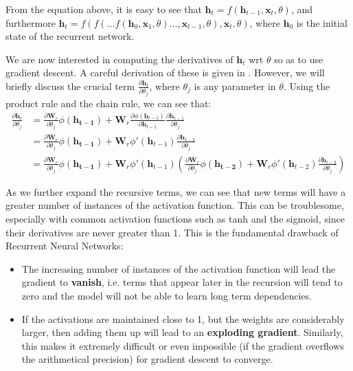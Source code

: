 \documentclass[pdftex,11pt,a4paper]{article}
\theoremstyle{definition}
\theoremstyle{remark}
\newcommand*{\V}[1]{\mathbf{#1}}%
\begin{document}
\par From the equation above, it is easy to see that $\V{h}_t = f(\V{h}_{t-1}, \V{x}_t, \theta)$, and furthermore $\V{h}_t = f(f(...f(\V{h}_0, \V{x}_1, \theta)..., \V{x}_{t-1}, \theta), \V{x}_t, \theta)$, where $\V{h}_0$ is the initial state of the recurrent network. 
\par We are now interested in computing the derivatives of $\V{h}_t$ wrt $\theta$ so as to use gradient descent. A careful derivation of these is given in \cite{Pascanu2012}. However, we will briefly discuss the crucial term $\frac{\partial\V{h}_t}{\partial\theta_j}$, where $\theta_j$ is any parameter in $\theta$. Using the product rule and the chain rule, we can see that:
\begin{align*}
    \frac{\partial\V{h}_t}{\partial\theta_j} &= \frac{\partial\V{W}_r}{\partial\theta_j} \phi(\V{h_{t-1}}) + \V{W}_r\frac{\partial \phi(\V{h}_{t-1})}{\partial\V{h}_{t-1}}\frac{\partial \V{h}_{t-1}}{\partial\theta_j}\\
    &= \frac{\partial\V{W}_r}{\partial\theta_j} \phi(\V{h_{t-1}}) + \V{W}_r\phi'(\V{h}_{t-1})\frac{\partial \V{h}_{t-1}}{\partial\theta_j}\\
    &= \frac{\partial\V{W}_r}{\partial\theta_j} \phi(\V{h_{t-1}}) + \V{W}_r\phi'(\V{h}_{t-1})\left(\frac{\partial\V{W}_r}{\partial\theta_j} \phi(\V{h_{t-2}}) + \V{W}_r\phi'(\V{h}_{t-2})\frac{\partial \V{h}_{t-2}}{\partial\theta_j}\right)
\end{align*}
\par As we further expand the recursive terms, we can see that new terms will have a greater number of instances of the activation function. This can be troublesome, especially with common activation functions such as tanh and the sigmoid, since their derivatives are never greater than 1. This is the fundamental drawback of Recurrent Neural Networks: 
\begin{itemize}
    \item The increasing number of instances of the activation function will lead the gradient to \textbf{vanish}, i.e. terms that appear later in the recursion will tend to zero and the model will not be able to learn long term dependencies.
    \item If the activations are maintained close to 1, but the weights are considerably larger, then adding them up will lead to an \textbf{exploding gradient}. Similarly, this makes it extremely difficult or even impossible (if the gradient overflows the arithmetical precision) for gradient descent to converge.
\end{itemize}
\end{document}
